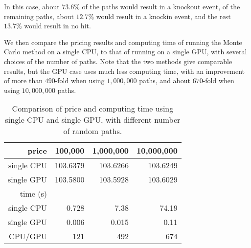In this case, about $73.6\%$ of the paths would result in a knockout event, of the remaining
paths, about $12.7\%$ would result in a knockin event, and the rest $13.7\%$ would
result in no hit.

We then compare the pricing results and computing time of running the Monte
Carlo method on a single CPU, to that of running on a single GPU, with several
choices of the number of paths. 
Note that the two methods give comparable results, but the GPU case uses much
less computing time, with an improvement of more than $490$-fold when using
$1,000,000$ paths, and about $670$-fold when using $10,000,000$ paths.

\begin{table*}
\caption{Comparison of price and computing time using single CPU and 
single GPU, with different number of random paths.}
\begin{tabular}{r|r r r}
\hline\hline
price  & 100,000 & 1,000,000 & 10,000,000 \\ 
\hline
single CPU & 103.6379 & 103.6266 & 103.6249 \\
\hline
single GPU & 103.5800 & 103.5928 & 103.6029 \\ 
\hline
time (s) &  &  &  \\ 
\hline
single CPU & 0.728 & 7.38 & 74.19 \\
\hline
single GPU & 0.006 & 0.015 & 0.11 \\ 
\hline
CPU/GPU &  121 & 492 & 674 \\
\hline
\end{tabular}
\end{table*}



